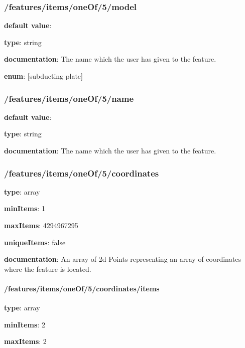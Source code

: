 \subsubsection{/features/items/oneOf/5/model} \begin{itemized}
\item {\bf default value}: 
\item {\bf type}: string
\item {\bf documentation}: The name which the user has given to the feature.
\item {\bf enum}: [subducting plate]\end{itemized}\subsubsection{/features/items/oneOf/5/name} \begin{itemized}
\item {\bf default value}: 
\item {\bf type}: string
\item {\bf documentation}: The name which the user has given to the feature.
\end{itemized}\subsubsection{/features/items/oneOf/5/coordinates} \begin{itemized}
\item {\bf type}: array
\item {\bf minItems}: 1
\item {\bf maxItems}: 4294967295
\item {\bf uniqueItems}: false
\item {\bf documentation}: An array of 2d Points representing an array of coordinates where the feature is located.
\paragraph{/features/items/oneOf/5/coordinates/items} \begin{itemized}
\item {\bf type}: array
\item {\bf minItems}: 2
\item {\bf maxItems}: 2

\end{itemized}
\end{itemized}
